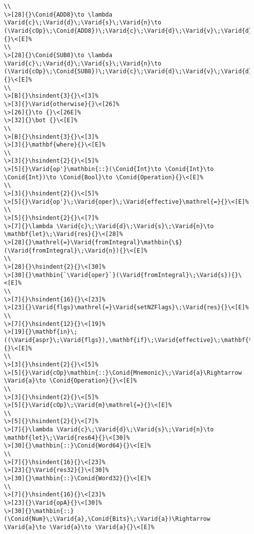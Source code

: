 \documentclass{article}
\newcommand{\Conid}[1]{\mathit{#1}}
\newcommand{\Varid}[1]{\mathit{#1}}
\newcommand{\hsindent}[1]{\quad}%
\begin{document}
\begin{Verbatim}[fontsize=\scriptsize]
\\
\>[28]{}\Conid{ADD8}\to \lambda \Varid{c}\;\Varid{d}\;\Varid{s}\;\Varid{n}\to (\Varid{cOp}\;\Conid{ADD8})\;\Varid{c}\;\Varid{d}\;\Varid{v}\;\Varid{d}{}\<[E]%
\\
\>[28]{}\Conid{SUB8}\to \lambda \Varid{c}\;\Varid{d}\;\Varid{s}\;\Varid{n}\to (\Varid{cOp}\;\Conid{SUB8})\;\Varid{c}\;\Varid{d}\;\Varid{v}\;\Varid{d}{}\<[E]%
\\
\>[B]{}\hsindent{3}{}\<[3]%
\>[3]{}\Varid{otherwise}{}\<[26]%
\>[26]{}\to {}\<[26E]%
\>[32]{}\bot {}\<[E]%
\\
\>[B]{}\hsindent{3}{}\<[3]%
\>[3]{}\mathbf{where}{}\<[E]%
\\
\>[3]{}\hsindent{2}{}\<[5]%
\>[5]{}\Varid{op'}\mathbin{::}(\Conid{Int}\to \Conid{Int}\to \Conid{Int})\to \Conid{Bool}\to \Conid{Operation}{}\<[E]%
\\
\>[3]{}\hsindent{2}{}\<[5]%
\>[5]{}\Varid{op'}\;\Varid{oper}\;\Varid{effective}\mathrel{=}{}\<[E]%
\\
\>[5]{}\hsindent{2}{}\<[7]%
\>[7]{}\lambda \Varid{c}\;\Varid{d}\;\Varid{s}\;\Varid{n}\to \mathbf{let}\;\Varid{res}{}\<[28]%
\>[28]{}\mathrel{=}\Varid{fromIntegral}\mathbin{\$}(\Varid{fromIntegral}\;\Varid{n}){}\<[E]%
\\
\>[28]{}\hsindent{2}{}\<[30]%
\>[30]{}\mathbin{`\Varid{oper}`}(\Varid{fromIntegral}\;\Varid{s}){}\<[E]%
\\
\>[7]{}\hsindent{16}{}\<[23]%
\>[23]{}\Varid{flgs}\mathrel{=}\Varid{setNZFlags}\;\Varid{res}{}\<[E]%
\\
\>[7]{}\hsindent{12}{}\<[19]%
\>[19]{}\mathbf{in}\;((\Varid{aspr}\;\Varid{flgs}),\mathbf{if}\;\Varid{effective}\;\mathbf{then}\;\Varid{res}\;\mathbf{else}\;\Varid{d}){}\<[E]%
\\
\>[3]{}\hsindent{2}{}\<[5]%
\>[5]{}\Varid{cOp}\mathbin{::}\Conid{Mnemonic}\;\Varid{a}\Rightarrow \Varid{a}\to \Conid{Operation}{}\<[E]%
\\
\>[3]{}\hsindent{2}{}\<[5]%
\>[5]{}\Varid{cOp}\;\Varid{m}\mathrel{=}{}\<[E]%
\\
\>[5]{}\hsindent{2}{}\<[7]%
\>[7]{}\lambda \Varid{c}\;\Varid{d}\;\Varid{s}\;\Varid{n}\to \mathbf{let}\;\Varid{res64}{}\<[30]%
\>[30]{}\mathbin{::}\Conid{Word64}{}\<[E]%
\\
\>[7]{}\hsindent{16}{}\<[23]%
\>[23]{}\Varid{res32}{}\<[30]%
\>[30]{}\mathbin{::}\Conid{Word32}{}\<[E]%
\\
\>[7]{}\hsindent{16}{}\<[23]%
\>[23]{}\Varid{opA}{}\<[30]%
\>[30]{}\mathbin{::}(\Conid{Num}\;\Varid{a},\Conid{Bits}\;\Varid{a})\Rightarrow \Varid{a}\to \Varid{a}\to \Varid{a}{}\<[E]%

\end{Verbatim}
\end{document}
